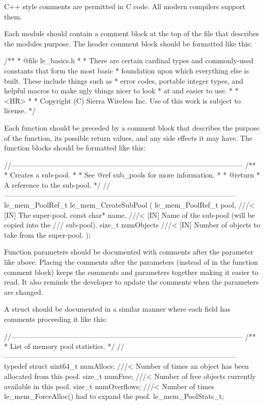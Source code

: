 C++ style comments are permitted in C code. All modern compilers support them.

Each module should contain a comment block at the top of the file that describes the module\textquotesingle{}s purpose. The header comment block should be formatted like this\+:

\begin{DoxyVerb}/**
 * @file le_basics.h
 *
 * There are certain cardinal types and commonly-used constants that form the most basic
 * foundation upon which everything else is built.  These include things such as
 * error codes, portable integer types, and helpful macros to make ugly things nicer to look
 * at and easier to use.
 *
 * <HR>
 *
 * Copyright (C) Sierra Wireless Inc. Use of this work is subject to license.
 */
\end{DoxyVerb}


Each function should be preceded by a comment block that describes the purpose of the function, its possible return values, and any side effects it may have. The function blocks should be formatted like this\+:

\begin{DoxyVerb}//--------------------------------------------------------------------------------------------------
/**
 * Creates a sub-pool.
 *
 * See @ref sub_pools for more information.
 *
 * @return
 *      A reference to the sub-pool.
 */
//--------------------------------------------------------------------------------------------------
le_mem_PoolRef_t le_mem_CreateSubPool
(
    le_mem_PoolRef_t    pool,       ///< [IN] The super-pool.
    const char*         name,       ///< [IN] Name of the sub-pool (will be copied into the
                                    ///   sub-pool).
    size_t              numObjects  ///< [IN] Number of objects to take from the super-pool.
);
\end{DoxyVerb}


Function parameters should be documented with comments after the parameter like above. Placing the comments after the parameters (instead of in the function comment block) keeps the comments and parameters together making it easier to read. It also reminds the developer to update the comments when the parameters are changed.

A struct should be documented in a similar manner where each field has comments proceeding it like this\+:

\begin{DoxyVerb}//--------------------------------------------------------------------------------------------------
/**
 * List of memory pool statistics.
 */
//--------------------------------------------------------------------------------------------------
typedef struct
{
    uint64_t    numAllocs;      ///< Number of times an object has been allocated from this pool.
    size_t      numFree;        ///< Number of free objects currently available in this pool.
    size_t      numOverflows;   ///< Number of times le_mem_ForceAlloc() had to expand the pool.
}
le_mem_PoolStats_t;
\end{DoxyVerb}


